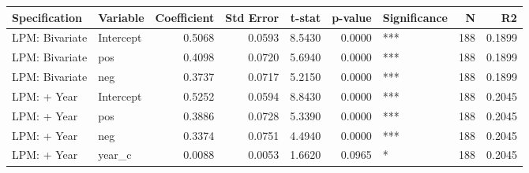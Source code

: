 \begin{tabular}{llrrrrlrr}
\toprule
Specification & Variable & Coefficient & Std Error & t-stat & p-value & Significance & N & R2 \\
\midrule
LPM: Bivariate & Intercept & 0.5068 & 0.0593 & 8.5430 & 0.0000 & *** & 188 & 0.1899 \\
LPM: Bivariate & pos & 0.4098 & 0.0720 & 5.6940 & 0.0000 & *** & 188 & 0.1899 \\
LPM: Bivariate & neg & 0.3737 & 0.0717 & 5.2150 & 0.0000 & *** & 188 & 0.1899 \\
LPM: + Year & Intercept & 0.5252 & 0.0594 & 8.8430 & 0.0000 & *** & 188 & 0.2045 \\
LPM: + Year & pos & 0.3886 & 0.0728 & 5.3390 & 0.0000 & *** & 188 & 0.2045 \\
LPM: + Year & neg & 0.3374 & 0.0751 & 4.4940 & 0.0000 & *** & 188 & 0.2045 \\
LPM: + Year & year_c & 0.0088 & 0.0053 & 1.6620 & 0.0965 & * & 188 & 0.2045 \\
\bottomrule
\end{tabular}
